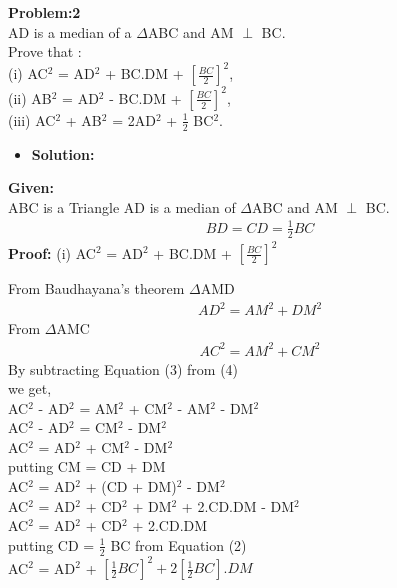\begin{frame}
{\textbf{Problem:2}\\AD is a median of a $\Delta$ABC and AM $\perp$ BC.\\
Prove that : \\
(i) AC$^2$ = AD$^2$ + BC.DM + $\left[\frac{BC}{2}\right]^2$,\\
(ii) AB$^2$ = AD$^2$ - BC.DM + $\left[\frac{BC}{2}\right]^2$,\\
(iii) AC$^2$ + AB$^2$ = 2AD$^2$ + $\frac{1}{2}$ BC$^2$.}
\begin{itemize}
\item \textbf{Solution:}
\end{itemize}
\textbf{Given:}\\
ABC is a Triangle AD is a median of $\Delta$ABC and AM $\perp$ BC.
\begin{align}
BD = CD = \frac{1}{2} BC
\end{align}
\textbf{Proof:}
(i) AC$^2$ = AD$^2$ + BC.DM + $\left[\frac{BC}{2}\right]^2$\\
\end{frame}
\begin{frame}
From Baudhayana's theorem $\Delta$AMD
\begin{align}
AD^2 = AM^2 + DM^2
\end{align}
From $\Delta$AMC
\begin{align}
AC^2 = AM^2 + CM^2
\end{align}
By subtracting Equation (3) from (4)\\
we get,\\ 
AC$^2$ - AD$^2$ = AM$^2$ + CM$^2$ - AM$^2$ - DM$^2$\\
AC$^2$ - AD$^2$ = CM$^2$ - DM$^2$\\
AC$^2$ = AD$^2$ + CM$^2$ - DM$^2$\\ 
putting CM = CD + DM \\ 
\enspace
AC$^2$ = AD$^2$ + (CD + DM)$^2$ - DM$^2$\\ 
AC$^2$ = AD$^2$ + CD$^2$ + DM$^2$ + 2.CD.DM - DM$^2$\\
AC$^2$ = AD$^2$ + CD$^2$ + 2.CD.DM\\
putting CD = $\frac{1}{2}$ BC from Equation (2)\\
AC$^2$ = AD$^2$ + $\left[\frac{1}{2} BC\right]^2 + 2\left[\frac{1}{2} BC\right].DM$
\end{frame}
